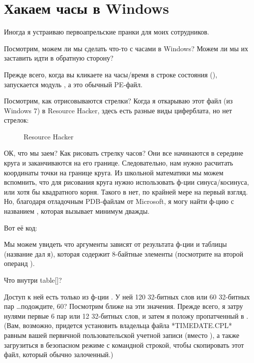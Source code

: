 \section{Хакаем часы в Windows}

Иногда я устраиваю первоапрельские пранки для моих сотрудников.

Посмотрим, можем ли мы сделать что-то с часами в Windows?
Можем ли мы их заставить идти в обратную сторону?

Прежде всего, когда вы кликаете на часы/время в строке состояния (),\\
запускается модуль ,
а это обычный \ac{PE}-файл.

Посмотрим, как отрисовываются стрелки?
Когда я откарываю этот файл (из Windows 7) в Resource Hacker, здесь есть разные виды циферблата, но нет стрелок:

\begin{figure}[H]
\centering
{}
\caption{Resource Hacker}
\end{figure}

ОК, что мы заем? Как рисовать стрелку часов? Они все начинаются в середине круга и заканчиваются на его границе.
Следовательно, нам нужно расчитать координаты точки на границе круга.
Из школьной математики мы можем вспомнить, что для рисования круга нужно использовать ф-ции синуса/косинуса, или
хотя бы квадратного корня.
Такого в  нет, по крайней мере на первый взгляд.
Но, благодаря отладочным PDB-файлам от Microsoft, я могу найти ф-цию с названием , которая
вызывает  минимум дважды.

Вот её код:



Мы можем увидеть что аргументы  зависят от результата ф-ции 
и таблицы  (название дал я),
которая содержит 8-байтные элементы (посмотрите на второй операнд ).

Что внутри table[]?



Доступ к ней есть только из ф-ции .
У ней 120 32-битных слов или 60 32-битных пар \dots подождите, 60?
Посмотрим ближе на эти значения.
Прежде всего, я затру нулями первые 6 пар или 12 32-битных слов, и затем я положу пропатченный 
в .
(Вам, возможно, придется установить владельца файла *TIMEDATE.CPL* равным вашей первичной пользовательской учетной
записи (вместо ),
а также загрузиться в безопасном режиме с командной строкой, чтобы скопировать этот файл, который обычно залоченный.)

